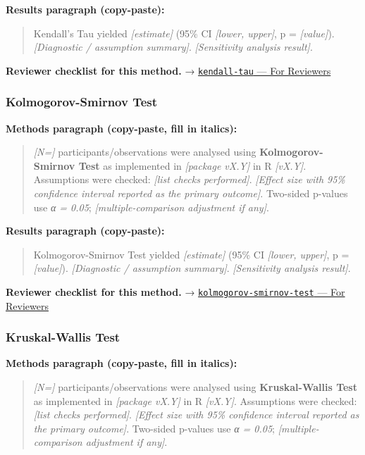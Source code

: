 \documentclass[
]{article}
\begin{document}
\textbf{Results paragraph (copy-paste):}

\begin{quote}
Kendall's Tau yielded \emph{{[}estimate{]}} (95\% CI \emph{{[}lower,
upper{]}}, p = \emph{{[}value{]}}). \emph{{[}Diagnostic / assumption
summary{]}}. \emph{{[}Sensitivity analysis result{]}}.
\end{quote}

\textbf{Reviewer checklist for this method.} →
\href{../chapters/04-inferential/kendall-tau.Rmd\#for-reviewers}{\texttt{kendall-tau}
--- For Reviewers}

\subsubsection{Kolmogorov-Smirnov Test}\label{kolmogorov-smirnov-test}

\textbf{Methods paragraph (copy-paste, fill in italics):}

\begin{quote}
\emph{{[}N={]}} participants/observations were analysed using
\textbf{Kolmogorov-Smirnov Test} as implemented in \emph{{[}package
vX.Y{]}} in R \emph{{[}vX.Y{]}}. Assumptions were checked: \emph{{[}list
checks performed{]}}. \emph{{[}Effect size with 95\% confidence interval
reported as the primary outcome{]}}. Two-sided p-values use \emph{α =
0.05}; \emph{{[}multiple-comparison adjustment if any{]}}.
\end{quote}

\textbf{Results paragraph (copy-paste):}

\begin{quote}
Kolmogorov-Smirnov Test yielded \emph{{[}estimate{]}} (95\% CI
\emph{{[}lower, upper{]}}, p = \emph{{[}value{]}}). \emph{{[}Diagnostic
/ assumption summary{]}}. \emph{{[}Sensitivity analysis result{]}}.
\end{quote}

\textbf{Reviewer checklist for this method.} →
\href{../chapters/04-inferential/kolmogorov-smirnov-test.Rmd\#for-reviewers}{\texttt{kolmogorov-smirnov-test}
--- For Reviewers}

\subsubsection{Kruskal-Wallis Test}\label{kruskal-wallis-test}

\textbf{Methods paragraph (copy-paste, fill in italics):}

\begin{quote}
\emph{{[}N={]}} participants/observations were analysed using
\textbf{Kruskal-Wallis Test} as implemented in \emph{{[}package vX.Y{]}}
in R \emph{{[}vX.Y{]}}. Assumptions were checked: \emph{{[}list checks
performed{]}}. \emph{{[}Effect size with 95\% confidence interval
reported as the primary outcome{]}}. Two-sided p-values use \emph{α =
0.05}; \emph{{[}multiple-comparison adjustment if any{]}}.
\end{quote}
\end{document}
